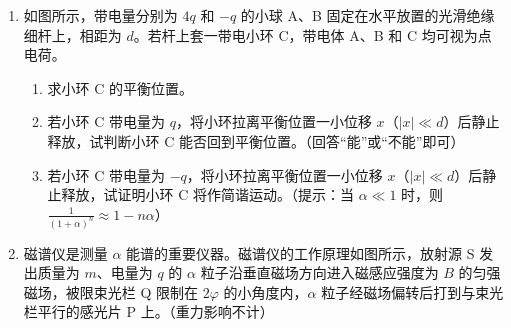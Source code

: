 \documentclass[\gkver]{gaokaozhenti}
\begin{document}
\begin{enumerate}
\item
如图所示，带电量分别为 $4q$ 和 $-q$ 的小球 A、B 固定在水平放置的光滑绝缘细杆上，相距为 $d$。若杆上套一带电小环 C，带电体 A、B 和 C 均可视为点电荷。

\begin{enumerate}
	\item
	求小环 C 的平衡位置。
	
	\item
	若小环 C 带电量为 $q$，将小环拉离平衡位置一小位移 $x$（$|x|\ll d$）后静止释放，试判断小环 C 能否回到平衡位置。（回答“能”或“不能”即可）
	
	\item
	若小环 C 带电量为 $-q$，将小环拉离平衡位置一小位移 $x$（$|x|\ll d$）后静止释放，试证明小环 C 将作简谐运动。（提示：当 $\alpha\ll1$ 时，则 $\frac{1}{(1+\alpha)^n}\approx1-n\alpha$）
\end{enumerate}

\onepicture[align=right, w=6.07cm]{}


\item
磁谱仪是测量 $\alpha$ 能谱的重要仪器。磁谱仪的工作原理如图所示，放射源 S 发出质量为 $m$、电量为 $q$ 的 $\alpha$ 粒子沿垂直磁场方向进入磁感应强度为 $B$ 的匀强磁场，被限束光栏 Q 限制在 $2\varphi$ 的小角度内，$\alpha$ 粒子经磁场偏转后打到与束光栏平行的感光片 P 上。（重力影响不计）


\end{enumerate}
\end{document}
